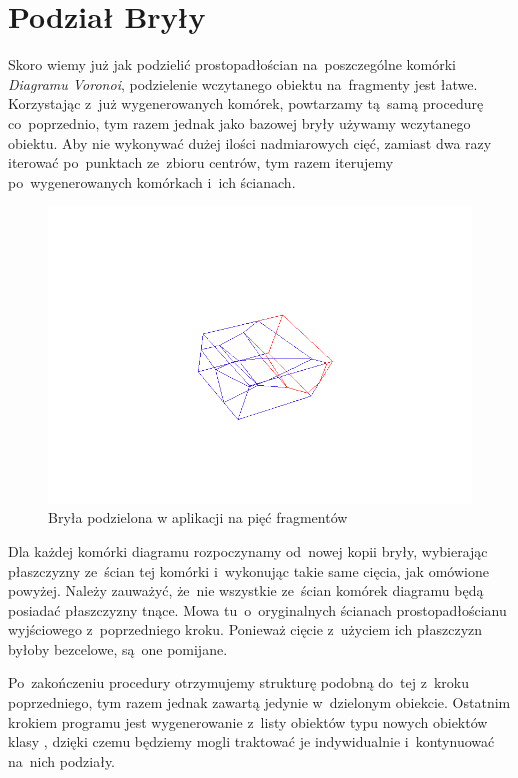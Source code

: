 \documentclass[skorowidz,autorrok,backref,xodstep,oswiadczenie]{wmimgr}
\begin{document}
\section{Podział Bryły}

Skoro wiemy już jak podzielić prostopadłościan na~poszczególne komórki \emph{Diagramu Voronoi}, podzielenie wczytanego obiektu na~fragmenty jest łatwe. Korzystając z~już wygenerowanych komórek, powtarzamy tą~samą procedurę co~poprzednio, tym razem jednak jako bazowej bryły używamy wczytanego obiektu. Aby nie wykonywać dużej ilości nadmiarowych cięć, zamiast dwa razy iterować po~punktach ze~zbioru centrów, tym razem iterujemy po~wygenerowanych komórkach i~ich ścianach.

\begin{figure}[ht!]
\centering
\includegraphics[width=140mm]{images/app3_1.png}
\caption{Bryła podzielona w aplikacji na pięć fragmentów}
\label{newpointposition}
\end{figure}

Dla każdej komórki diagramu rozpoczynamy od~nowej kopii bryły, wybierając płaszczyzny ze~ścian tej komórki i~wykonując takie same cięcia, jak omówione powyżej. Należy zauważyć, że~nie wszystkie ze~ścian komórek diagramu będą posiadać płaszczyzny tnące. Mowa tu~o~oryginalnych ścianach prostopadłościanu wyjściowego z~poprzedniego kroku. Ponieważ cięcie z~użyciem ich płaszczyzn byłoby bezcelowe, są~one pomijane.

Po~zakończeniu procedury otrzymujemy strukturę podobną do~tej z~kroku poprzedniego, tym razem jednak zawartą jedynie w~dzielonym obiekcie. Ostatnim krokiem programu jest wygenerowanie z~listy obiektów typu  nowych obiektów klasy , dzięki czemu będziemy mogli traktować je indywidualnie i~kontynuować na~nich podziały.
\end{document}
